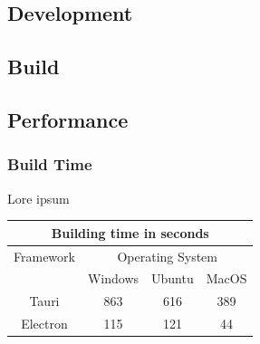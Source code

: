 \subsection{Development}
\label{subsec:impl:dev}

\subsection{Build}
\label{subsec:impl:build}

\label{tab:buildtime:statistics}

\subsection{Performance}
\label{subsec:impl:performance}
\subsubsection{Build Time}
\label{subsubsec:perf:buildtime}
Lore ipsum
\\
\begin{tabular} {| c | c | c | c |}

    \hline
    \multicolumn{4}{|c|}{Building time in seconds} \\ \hline
    Framework & \multicolumn{3}{|c|}{Operating System} \\ \hline
    & Windows & Ubuntu & MacOS \\ \hline
    Tauri & 863 & 616 & 389 \\ \hline
    Electron & 115 & 121 & 44 \\ \hline

\end{tabular} \\ \\
